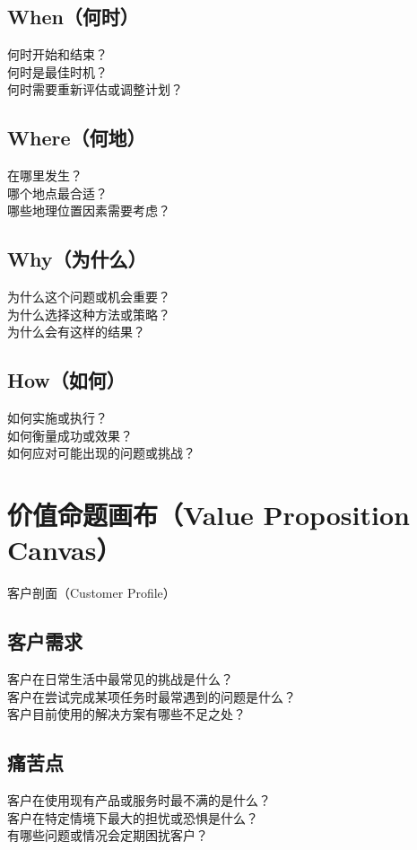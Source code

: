 \documentclass[12pt]{book}
\begin{document}
\subsection{When（何时）}
何时开始和结束？\\
何时是最佳时机？\\
何时需要重新评估或调整计划？\\

\subsection{Where（何地）}
在哪里发生？\\
哪个地点最合适？\\
哪些地理位置因素需要考虑？\\

\subsection{Why（为什么）}
为什么这个问题或机会重要？\\
为什么选择这种方法或策略？\\
为什么会有这样的结果？\\

\subsection{How（如何）}
如何实施或执行？\\
如何衡量成功或效果？\\
如何应对可能出现的问题或挑战？\\


\section{价值命题画布（Value Proposition Canvas）}
客户剖面（Customer Profile）
\subsection{客户需求}
客户在日常生活中最常见的挑战是什么？\\
客户在尝试完成某项任务时最常遇到的问题是什么？\\
客户目前使用的解决方案有哪些不足之处？\\

\subsection{痛苦点}
客户在使用现有产品或服务时最不满的是什么？\\
客户在特定情境下最大的担忧或恐惧是什么？\\
有哪些问题或情况会定期困扰客户？\\
\end{document}
